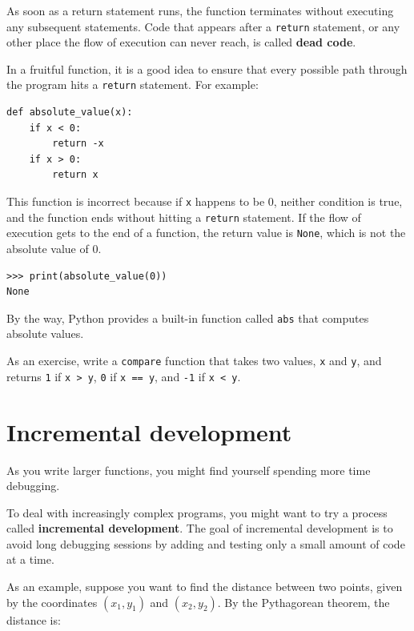 \documentclass[10pt]{book}
\begin{document}
As soon as a return statement runs, the function
terminates without executing any subsequent statements.
Code that appears after a {\tt return} statement, or any other place
the flow of execution can never reach, is called {\bf dead code}.

In a fruitful function, it is a good idea to ensure
that every possible path through the program hits a
{\tt return} statement.  For example:

\begin{verbatim}
def absolute_value(x):
    if x < 0:
        return -x
    if x > 0:
        return x
\end{verbatim}
%
This function is incorrect because if {\tt x} happens to be 0,
neither condition is true, and the function ends without hitting a
{\tt return} statement.  If the flow of execution gets to the end
of a function, the return value is {\tt None}, which is not
the absolute value of 0.

\begin{verbatim}
>>> print(absolute_value(0))
None
\end{verbatim}
%
By the way, Python provides a built-in function called 
{\tt abs} that computes absolute values.

As an exercise, write a {\tt compare} function that
takes two values, {\tt x} and {\tt y}, and returns {\tt 1} if {\tt x > y},
{\tt 0} if {\tt x == y}, and {\tt -1} if {\tt x < y}.


\section{Incremental development}
\label{incremental.development}

As you write larger functions, you might find yourself
spending more time debugging.

To deal with increasingly complex programs,
you might want to try a process called
{\bf incremental development}.  The goal of incremental development
is to avoid long debugging sessions by adding and testing only
a small amount of code at a time.

As an example, suppose you want to find the distance between two
points, given by the coordinates $(x_1, y_1)$ and $(x_2, y_2)$.
By the Pythagorean theorem, the distance is:
\end{document}
